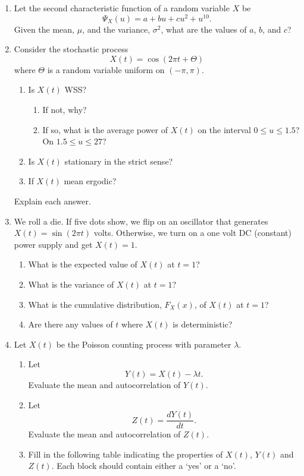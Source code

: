 \documentclass{article}[10pt]
\begin{document}
\begin{enumerate}




\item Let the second characteristic function of a random variable $X$ be
  $$ \Psi_X (u ) = a + bu + cu^2 + u^{10} .$$
  Given the mean, $\mu$, and the variance, $\sigma^2$, what are the values of $a$, $b$, and $c$?



\item Consider the stochastic process
  $$X(t)= \cos (2 \pi t + \Theta  )$$
  where $\Theta$ is  a random variable uniform on $(-\pi, \pi)$.
  \begin{enumerate}
  \item Is $X(t)$ WSS?
    \begin{enumerate}
    \item If not, why?
    \item If so, what is the average power of $X(t)$ on the interval $0\leq u \leq 1.5$? On $1.5\leq u \leq 27$?
    \end{enumerate}
  \item Is $X(t)$ stationary in the strict sense?
  \item If $X(t)$ mean ergodic?
  \end{enumerate}
  Explain each answer.


\item  We roll a die.  If five dots show, we flip on an oscillator that generates $X(t) = \sin (2 \pi t)$ volts.  Otherwise, we turn on a one volt DC (constant) power supply and get $X(t)=1$.
  \begin{enumerate}
  \item  What is the expected value of $X(t)$ at $t=1$?
  \item  What is the variance of $X(t)$ at $t=1$?
  \item   What is the cumulative distribution, $F_X (x)$, of $X(t)$ at $t=1$?
  \item  Are there any values of $t$ where $X(t)$ is deterministic?
  \end{enumerate}

\item  Let $X(t)$ be the Poisson counting process with parameter $\lambda$.
  \begin{enumerate}
  \item Let
    $$ Y(t) = X(t) - \lambda t .$$
    Evaluate the mean and autocorrelation of $Y(t)$.
  \item Let
    $$Z(t) = \frac{dY(t)}{dt}.$$
    Evaluate the mean and autocorrelation of $Z(t)$.
  \item Fill in the following table indicating the properties of $X(t)$, $Y(t)$ and $Z(t)$. Each block should contain either a `yes' or a `no'.


\end{enumerate}
\end{enumerate}
\end{document}
